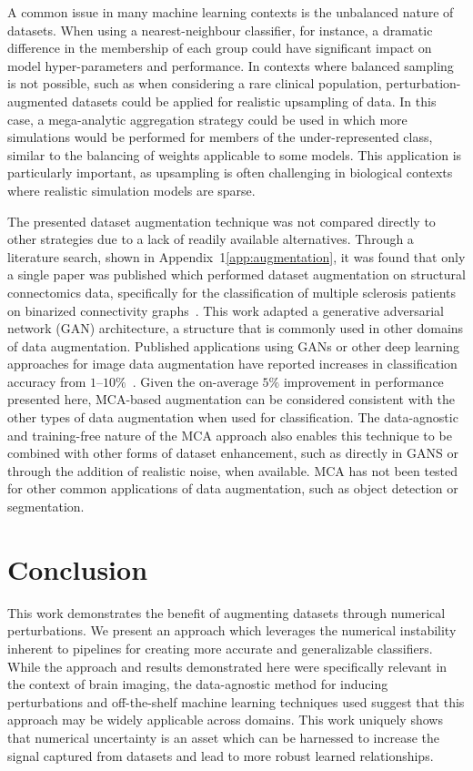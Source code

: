 \documentclass[10pt]{SelfArx} %
\newcommand{\new}[1]{\color{blue}#1\color{black}}
\begin{document}
A common issue in many machine learning contexts is the unbalanced nature of datasets. When using a nearest-neighbour
classifier, for instance, a dramatic difference in the membership of each group could have significant impact on model
hyper-parameters and performance. In contexts where balanced sampling is not possible, such as when considering a rare
clinical population, perturbation-augmented datasets could be applied for realistic upsampling of data. In this case, a
mega-analytic aggregation strategy could be used in which more simulations would be performed for members of the
under-represented class, similar to the balancing of weights applicable to some models. This application is
particularly important, as upsampling is often challenging in biological contexts where realistic simulation models are
sparse.

\new{The presented dataset augmentation technique was not compared directly to other strategies due to a lack of
readily available alternatives. Through a literature search, shown in Appendix~1\ref{app:augmentation}, it was found
that only a single paper was published which performed dataset augmentation on structural connectomics data,
specifically for the classification of multiple sclerosis patients on binarized connectivity
graphs~\cite{barile2021data}. This work adapted a generative adversarial network (GAN) architecture, a structure that
is commonly used in other domains of data augmentation. Published applications using GANs or other deep learning
approaches for image data augmentation have reported increases in classification accuracy from
$1–10\%$~\cite{shorten2019survey}. Given the on-average $5\%$ improvement in performance presented here, MCA-based
augmentation can be considered consistent with the other types of data augmentation when used for classification. The
data-agnostic and training-free nature of the MCA approach also enables this technique to be combined with other forms
of dataset enhancement, such as directly in GANS or through the addition of realistic noise, when available. MCA has
not been tested for other common applications of data augmentation, such as object detection or segmentation.}


\section*{Conclusion}

This work demonstrates the benefit of augmenting datasets through numerical perturbations. We present an approach which
leverages the numerical instability inherent to pipelines for creating more accurate and generalizable classifiers.
While the approach and results demonstrated here were specifically relevant in the context of brain imaging, the
data-agnostic method for inducing perturbations and off-the-shelf machine learning techniques used suggest that this
approach may be widely applicable across domains. This work uniquely shows that numerical uncertainty is an asset which
can be harnessed to increase the signal captured from datasets and lead to more robust learned relationships.
\end{document}

